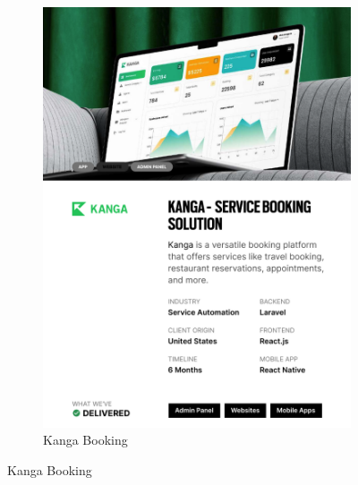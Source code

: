 \documentclass[12pt,a4paper]{report}
\begin{document}
\begin{figure}[h!]
\begin{subfigure}[b]{0.43\textwidth}
    \includegraphics[width=\textwidth]{Figures/kanga.png}
    \caption{Kanga Booking}
\end{subfigure}

\vspace{0.5cm}


\end{figure}
\end{document}
